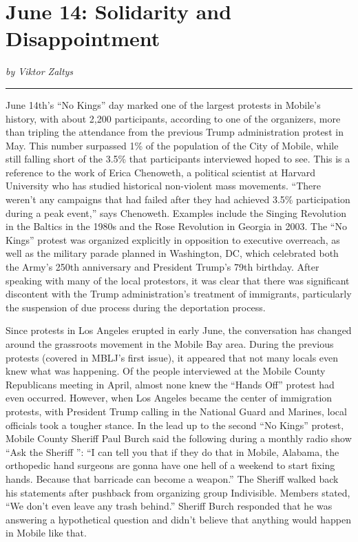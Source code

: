 \documentclass[
]{book}
\begin{document}
\section*{June 14: Solidarity and Disappointment}\label{june-14-solidarity-and-disappointment}

\emph{by Viktor Zaltys}

\begin{center}\rule{0.5\linewidth}{0.5pt}\end{center}

June 14th's ``No Kings'' day marked one of the largest protests in Mobile's history, with about 2,200 participants, according to one of the organizers, more than tripling the attendance from the previous Trump administration protest in May. This number surpassed 1\% of the population of the City of Mobile, while still falling short of the 3.5\% that participants interviewed hoped to see. This is a reference to the work of Erica Chenoweth, a political scientist at Harvard University who has studied historical non-violent mass movements. ``There weren't any campaigns that had failed after they had achieved 3.5\% participation during a peak event,'' says Chenoweth. Examples include the Singing Revolution in the Baltics in the 1980s and the Rose Revolution in Georgia in 2003. The ``No Kings'' protest was organized explicitly in opposition to executive overreach, as well as the military parade planned in Washington, DC, which celebrated both the Army's 250th anniversary and President Trump's 79th birthday. After speaking with many of the local protestors, it was clear that there was significant discontent with the Trump administration's treatment of immigrants, particularly the suspension of due process during the deportation process.

Since protests in Los Angeles erupted in early June, the conversation has changed around the grassroots movement in the Mobile Bay area. During the previous protests (covered in MBLJ's first issue), it appeared that not many locals even knew what was happening. Of the people interviewed at the Mobile County Republicans meeting in April, almost none knew the ``Hands Off'' protest had even occurred. However, when Los Angeles became the center of immigration protests, with President Trump calling in the National Guard and Marines, local officials took a tougher stance. In the lead up to the second ``No Kings'' protest, Mobile County Sheriff Paul Burch said the following during a monthly radio show ``Ask the Sheriff '': ``I can tell you that if they do that in Mobile, Alabama, the orthopedic hand surgeons are gonna have one hell of a weekend to start fixing hands. Because that barricade can become a weapon.'' The Sheriff walked back his statements after pushback from organizing group Indivisible. Members stated, ``We don't even leave any trash behind.'' Sheriff Burch responded that he was answering a hypothetical question and didn't believe that anything would happen in Mobile like that.
\end{document}
